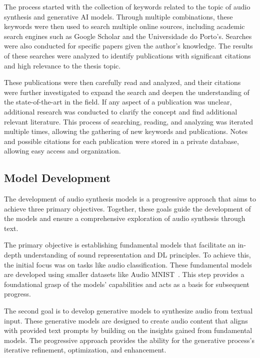 The process started with the collection of keywords related to the topic of audio synthesis and generative \ac{AI} models. Through multiple combinations, these keywords were then used to search multiple online sources, including academic search engines such as Google Scholar and the Universidade do Porto's. Searches were also conducted for specific papers given the author's knowledge. The results of these searches were analyzed to identify publications with significant citations and high relevance to the thesis topic.

These publications were then carefully read and analyzed, and their citations were further investigated to expand the search and deepen the understanding of the state-of-the-art in the field. If any aspect of a publication was unclear, additional research was conducted to clarify the concept and find additional relevant literature.
This process of searching, reading, and analyzing was iterated multiple times, allowing the gathering of new keywords and publications. Notes and possible citations for each publication were stored in a private database, allowing easy access and organization.

\subsection{Model Development} \label{sec:problem-model-development}

The development of audio synthesis models is a progressive approach that aims to achieve three primary objectives. Together, these goals guide the development of the models and ensure a comprehensive exploration of audio synthesis through text.

The primary objective is establishing fundamental models that facilitate an in-depth understanding of sound representation and \ac{DL} principles. To achieve this, the initial focus was on tasks like audio classification. These fundamental models are developed using smaller datasets like Audio MNIST~\cite{becker_interpreting_2018}. This step provides a foundational grasp of the models' capabilities and acts as a basis for subsequent progress.

The second goal is to develop generative models to synthesize audio from textual input. These generative models are designed to create audio content that aligns with provided text prompts by building on the insights gained from fundamental models. The progressive approach provides the ability for the generative process's iterative refinement, optimization, and enhancement.

